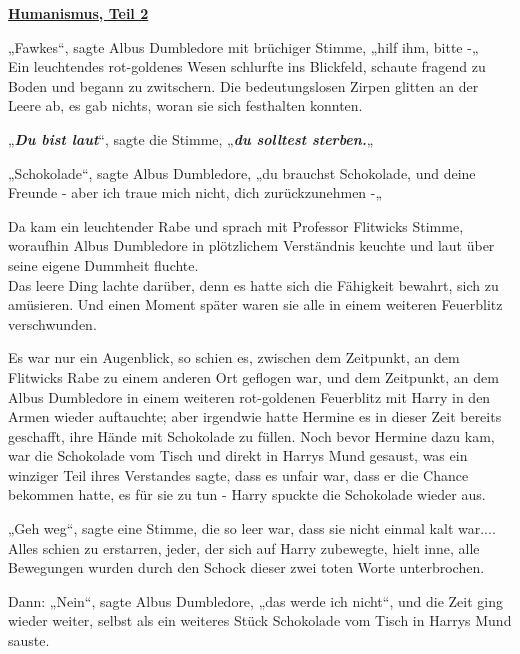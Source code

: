 

\hypertarget{humanismus-teil-2}{%

\textbf{\uline{Humanismus, Teil 2}}

\hfill\break „Fawkes“, sagte Albus Dumbledore mit brüchiger Stimme, „hilf ihm, bitte -„\\ Ein leuchtendes rot-goldenes Wesen schlurfte ins Blickfeld, schaute fragend zu Boden und begann zu zwitschern. Die bedeutungslosen Zirpen glitten an der Leere ab, es gab nichts, woran sie sich festhalten konnten.

„\textbf{\emph{Du bist laut}}“, sagte die Stimme, „\textbf{\emph{du solltest sterben.}}„

„Schokolade“, sagte Albus Dumbledore, „du brauchst Schokolade, und deine Freunde - aber ich traue mich nicht, dich zurückzunehmen -„

Da kam ein leuchtender Rabe und sprach mit Professor Flitwicks Stimme, woraufhin Albus Dumbledore in plötzlichem Verständnis keuchte und laut über seine eigene Dummheit fluchte.\\ Das leere Ding lachte darüber, denn es hatte sich die Fähigkeit bewahrt, sich zu amüsieren. Und einen Moment später waren sie alle in einem weiteren Feuerblitz verschwunden.

Es war nur ein Augenblick, so schien es, zwischen dem Zeitpunkt, an dem Flitwicks Rabe zu einem anderen Ort geflogen war, und dem Zeitpunkt, an dem Albus Dumbledore in einem weiteren rot-goldenen Feuerblitz mit Harry in den Armen wieder auftauchte; aber irgendwie hatte Hermine es in dieser Zeit bereits geschafft, ihre Hände mit Schokolade zu füllen. Noch bevor Hermine dazu kam, war die Schokolade vom Tisch und direkt in Harrys Mund gesaust, was ein winziger Teil ihres Verstandes sagte, dass es unfair war, dass er die Chance bekommen hatte, es für sie zu tun - Harry spuckte die Schokolade wieder aus.

„Geh weg“, sagte eine Stimme, die so leer war, dass sie nicht einmal kalt war.... Alles schien zu erstarren, jeder, der sich auf Harry zubewegte, hielt inne, alle Bewegungen wurden durch den Schock dieser zwei toten Worte unterbrochen.

Dann: „Nein“, sagte Albus Dumbledore, „das werde ich nicht“, und die Zeit ging wieder weiter, selbst als ein weiteres Stück Schokolade vom Tisch in Harrys Mund sauste.

}
